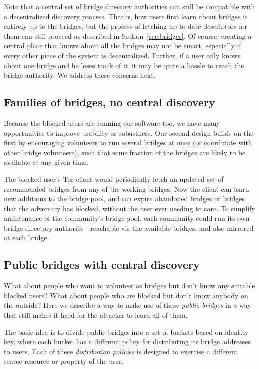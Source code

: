 \documentclass{llncs}
\begin{document}
Note that a central set of bridge directory authorities can still be
compatible with a decentralized discovery process. That is, how users
first learn about bridges is entirely up to the bridges, but the process
of fetching up-to-date descriptors for them can still proceed as described
in Section~\ref{sec:bridges}. Of course, creating a central place that
knows about all the bridges may not be smart, especially if every other
piece of the system is decentralized. Further, if a user only knows
about one bridge and he loses track of it, it may be quite a hassle to
reach the bridge authority. We address these concerns next.

\subsection{Families of bridges, no central discovery}

Because the blocked users are running our software too, we have many
opportunities to improve usability or robustness. Our second design builds
on the first by encouraging volunteers to run several bridges at once
(or coordinate with other bridge volunteers), such that some fraction
of the bridges are likely to be available at any given time.

The blocked user's Tor client would periodically fetch an updated set of
recommended bridges from any of the working bridges. Now the client can
learn new additions to the bridge pool, and can expire abandoned bridges
or bridges that the adversary has blocked, without the user ever needing
to care. To simplify maintenance of the community's bridge pool, each
community could run its own bridge directory authority---reachable via
the available bridges, and also mirrored at each bridge.

\subsection{Public bridges with central discovery}

What about people who want to volunteer as bridges but don't know any
suitable blocked users? What about people who are blocked but don't
know anybody on the outside? Here we describe a way to make use of these
\emph{public bridges} in a way that still makes it hard for the attacker
to learn all of them.

The basic idea is to divide public bridges into a set of buckets based on
identity key, where each bucket has a different policy for distributing
its bridge addresses to users. Each of these \emph{distribution policies}
is designed to exercise a different scarce resource or property of
the user.
\end{document}
